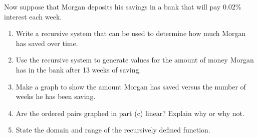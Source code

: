 \documentclass[10pt,]{book}
\theoremstyle{ptxdefinitionnotitle}
\theoremstyle{ptxdefinitiontitle}
\theoremstyle{ptxdefinitionnotitle}
\theoremstyle{ptxdefinitiontitle}
\theoremstyle{ptxdefinitionnotitle}
\theoremstyle{ptxdefinitiontitle}
\numberwithin{equation}{section}
\begin{document}
\begin{divisionexercise}{9}\hypertarget{exercise-11}{}
\hypertarget{p-29}{}%
Now suppose that Morgan deposits his savings in a bank that will pay \(0.02\%\) interest each week. \leavevmode%
\begin{enumerate}[label=(\alph*)]
\item\hypertarget{li-40}{}Write a recursive system that can be used to determine how much Morgan has saved over time.%
\item\hypertarget{li-41}{}Use the recursive system to generate values for the amount of money Morgan has in the bank after 13 weeks of saving.%
\item\hypertarget{li-42}{}Make a graph to show the amount Morgan has saved versus the number of weeks he has been saving.%
\item\hypertarget{li-43}{}Are the ordered pairs graphed in part (c) linear?  Explain why or why not.%
\item\hypertarget{li-44}{}State the domain and range of the recursively defined function.%
\end{enumerate}
%
\end{divisionexercise}%
\typeout{************************************************}
\typeout{************************************************}
\end{document}
